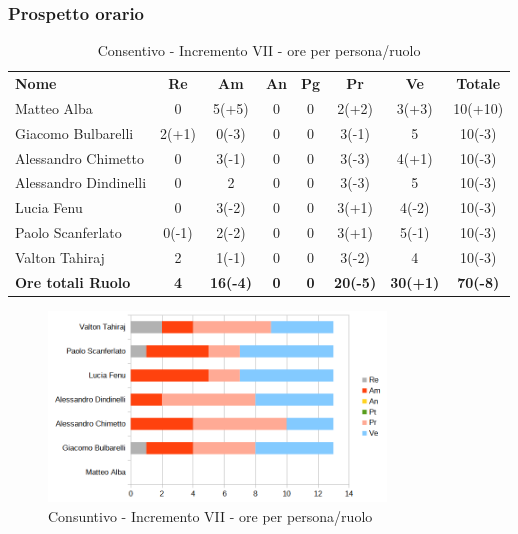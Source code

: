 \subsubsection{Prospetto orario}

\begin{table} [h!]
	\begin{center}
		\begin{tabular} { m{3.5cm} c c c c c c c }
			\rowcolor{lightgray}
			\textbf{Nome} & \textbf{Re} & \textbf{Am} & \textbf{An} & \textbf{Pg} & \textbf{Pr} & \textbf{Ve} & \textbf{Totale} \\
			Matteo Alba & 0 & 5(+5) & 0 & 0 & 2(+2) & 3(+3) & 10(+10) \\
			Giacomo Bulbarelli & 2(+1) & 0(-3) & 0 & 0 & 3(-1) & 5 & 10(-3) \\
			Alessandro Chimetto & 0 & 3(-1) & 0 & 0& 3(-3) & 4(+1) & 10(-3) \\
			Alessandro Dindinelli & 0 & 2 & 0 & 0 & 3(-3) & 5 & 10(-3) \\
			Lucia Fenu & 0 & 3(-2)& 0 & 0 & 3(+1) & 4(-2) & 10(-3) \\
			Paolo Scanferlato & 0(-1) & 2(-2) & 0 &0 & 3(+1) & 5(-1) & 10(-3) \\
			Valton Tahiraj & 2 & 1(-1) & 0 & 0 & 3(-2) & 4 & 10(-3) \\
			\textbf{Ore totali Ruolo} & \textbf{4} & \textbf{16(-4)} & \textbf{0} & \textbf{0} & \textbf{20(-5)}& \textbf{30(+1)} & \textbf{70(-8)}
		\end{tabular}
		\caption{Consentivo - Incremento VII - ore per persona/ruolo}
	\end{center}
\end{table}

\begin{figure} [h!]
	\centering
	\includegraphics[width=0.8\textwidth]{res/img/grafici/consuntivo-barre-val.png}
	\caption{Consuntivo - Incremento VII - ore per persona/ruolo} 
\end{figure}

